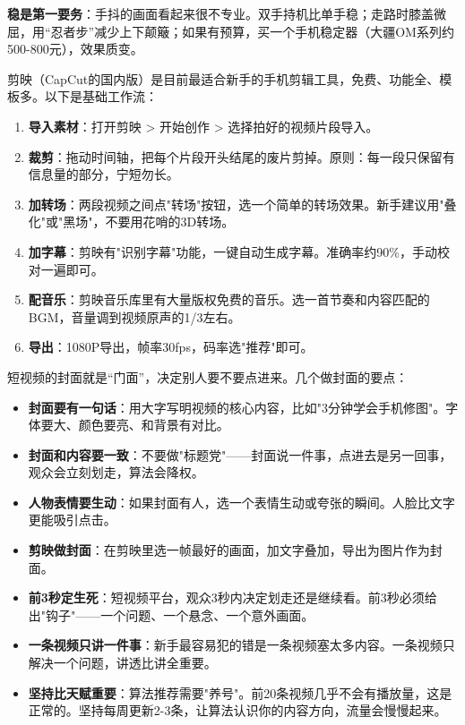 \textbf{稳是第一要务}：手抖的画面看起来很不专业。双手持机比单手稳；走路时膝盖微屈，用“忍者步”减少上下颠簸；如果有预算，买一个手机稳定器（大疆OM系列约500-800元），效果质变。


剪映（CapCut的国内版）是目前最适合新手的手机剪辑工具，免费、功能全、模板多。以下是基础工作流：

\begin{enumerate}
  \item \textbf{导入素材}：打开剪映 > 开始创作 > 选择拍好的视频片段导入。
  \item \textbf{裁剪}：拖动时间轴，把每个片段开头结尾的废片剪掉。原则：每一段只保留有信息量的部分，宁短勿长。
  \item \textbf{加转场}：两段视频之间点"转场"按钮，选一个简单的转场效果。新手建议用"叠化"或"黑场"，不要用花哨的3D转场。
  \item \textbf{加字幕}：剪映有"识别字幕"功能，一键自动生成字幕。准确率约90\%，手动校对一遍即可。
  \item \textbf{配音乐}：剪映音乐库里有大量版权免费的音乐。选一首节奏和内容匹配的BGM，音量调到视频原声的1/3左右。
  \item \textbf{导出}：1080P导出，帧率30fps，码率选"推荐"即可。
\end{enumerate}


短视频的封面就是“门面”，决定别人要不要点进来。几个做封面的要点：

\begin{itemize}
  \item \textbf{封面要有一句话}：用大字写明视频的核心内容，比如"3分钟学会手机修图"。字体要大、颜色要亮、和背景有对比。
  \item \textbf{封面和内容要一致}：不要做"标题党"——封面说一件事，点进去是另一回事，观众会立刻划走，算法会降权。
  \item \textbf{人物表情要生动}：如果封面有人，选一个表情生动或夸张的瞬间。人脸比文字更能吸引点击。
  \item \textbf{剪映做封面}：在剪映里选一帧最好的画面，加文字叠加，导出为图片作为封面。
\end{itemize}


\begin{itemize}
  \item \textbf{前3秒定生死}：短视频平台，观众3秒内决定划走还是继续看。前3秒必须给出"钩子"——一个问题、一个悬念、一个意外画面。
  \item \textbf{一条视频只讲一件事}：新手最容易犯的错是一条视频塞太多内容。一条视频只解决一个问题，讲透比讲全重要。
  \item \textbf{坚持比天赋重要}：算法推荐需要"养号"。前20条视频几乎不会有播放量，这是正常的。坚持每周更新2-3条，让算法认识你的内容方向，流量会慢慢起来。
\end{itemize}

